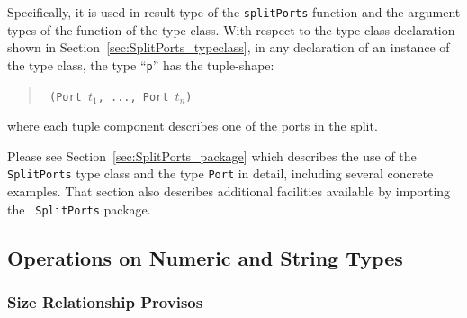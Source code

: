 Specifically, it is used in result type of the {\tt splitPorts}
function and the argument types of the  function of
the type class.  With respect to the  type class
declaration shown in Section~\ref{sec:SplitPorts_typeclass}, in any
declaration of an instance of the type class, the type ``{\tt p}'' has
the tuple-shape:

\begin{quote}\tt
(Port $t_1$, ..., Port $t_n$)
\end{quote}

where each tuple component describes one of the ports in the split.

Please see Section~\ref{sec:SplitPorts_package} which describes the
use of the {\tt SplitPorts} type class and the type {\tt Port} in
detail, including several concrete examples. That section also
describes additional facilities available by importing the {\tt
  SplitPorts} package.








\subsection{Operations on Numeric and String Types}

\subsubsection{Size Relationship Provisos}




